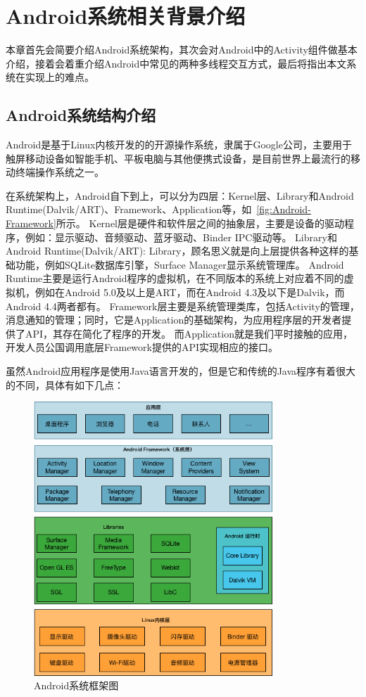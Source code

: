 \chapter{Android系统相关背景介绍 }  
\label{chp:background}


本章首先会简要介绍Android系统架构，其次会对Android中的Activity组件做基本介绍，接着会着重介绍Android中常见的两种多线程交互方式，最后将指出本文系统在实现上的难点。

\section{Android系统结构介绍}

Android是基于Linux内核开发的的开源操作系统，隶属于Google公司，主要用于触屏移动设备如智能手机、平板电脑与其他便携式设备，是目前世界上最流行的移动终端操作系统之一。

在系统架构上，Android自下到上，可以分为四层：Kernel层、Library和Android Runtime(Dalvik/ART)、Framework、Application等，如~\autoref{fig:Android-Framework}所示。
Kernel层是硬件和软件层之间的抽象层，主要是设备的驱动程序，例如：显示驱动、音频驱动、蓝牙驱动、Binder IPC驱动等。
Library和Android Runtime(Dalvik/ART): Library，顾名思义就是向上层提供各种这样的基础功能，例如SQLite数据库引擎，Surface Manager显示系统管理库。
Android Runtime主要是运行Android程序的虚拟机，在不同版本的系统上对应着不同的虚拟机，例如在Android 5.0及以上是ART，而在Android 4.3及以下是Dalvik，而Android 4.4两者都有。
Framework层主要是系统管理类库，包括Activity的管理，消息通知的管理；同时，它是Application的基础架构，为应用程序层的开发者提供了API，其存在简化了程序的开发。
而Application就是我们平时接触的应用，开发人员公国调用底层Framework提供的API实现相应的接口。

虽然Android应用程序是使用Java语言开发的，但是它和传统的Java程序有着很大的不同，具体有如下几点：

\begin{figure}[!h]
	\centering
	\includegraphics[width=0.8\textwidth]{./Figures/Android-Framework.png}
	\caption{Android系统框架图}
	\label{fig:Android-Framework}
\end{figure}


